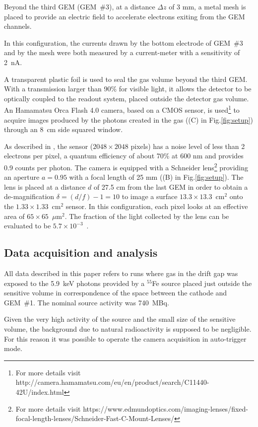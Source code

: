 \documentclass[a4paper,11pt]{article}
\begin{document}
Beyond the third GEM (GEM~\#3), at a distance $\Delta z$ of 3 mm, a metal mesh is placed to provide an electric field to accelerate electrons exiting from the GEM channels.

In this configuration, the currents drawn by the bottom electrode of GEM~\#3 and by the mesh were both measured by a current-meter with a sensitivity of 2~nA.

A transparent plastic foil
is used to seal the gas volume beyond the third GEM.
With a transmission larger than 90\% for visible light, 
it allows the detector to be optically coupled to the readout system, 
placed outside the detector gas volume.
An Hamamatsu Orca Flash 4.0 camera, based on a CMOS sensor, 
is used\footnote{For more details visit http://camera.hamamatsu.com/eu/en/product/search/C11440-42U/index.html}
to acquire images produced by the photons created in the gas ((C) in Fig.\ref{fig:setup})
through an 8~cm side squared window. 

As described in \cite{bib:jinst_orange1},
the sensor ($2048 \times 2048$ pixels) 
has a noise level of less than 2 electrons per pixel,
a quantum efficiency of about 70\% at 600 nm
and provides 0.9 counts per photon.
The camera is equipped with a Schneider 
lens\footnote{For more details visit https://www.edmundoptics.com/imaging-lenses/fixed-focal-length-lenses/Schneider-Fast-C-Mount-Lenses/} 
providing an aperture $a = 0.95$ with a focal length of 25 mm ((B) in Fig.\ref{fig:setup}).
The lens is placed at a distance $d$ of 27.5 cm from the last GEM
in order to obtain a de-magnification 
$\delta = (d/f) - 1 = 10$ to 
image a surface $13.3 \times 13.3$~cm$^2$ onto the 
$1.33 \times 1.33$~cm$^2$ sensor. 
In this configuration, each pixel
looks at an effective area of 
$65 \times 65$~$\mu$m$^2$.
The fraction of the light collected by the lens can be evaluated to be $5.7 \times 10^{-3}$~\cite{bib:jinst_orange1}.


\subsection{Data acquisition and analysis}

All data described in this paper refers to runs where gas in the drift gap was exposed to the 5.9~keV photons provided by a $^{55}$Fe source placed just outside the sensitive volume in correspondence of the space between the cathode and GEM~\#1.
The nominal source activity was 740~MBq.

Given the very high activity of the source and the small size of the sensitive volume, the background due to natural radioactivity is supposed to be negligible. For this reason it was possible to operate the camera acquisition in auto-trigger mode.
\end{document}
